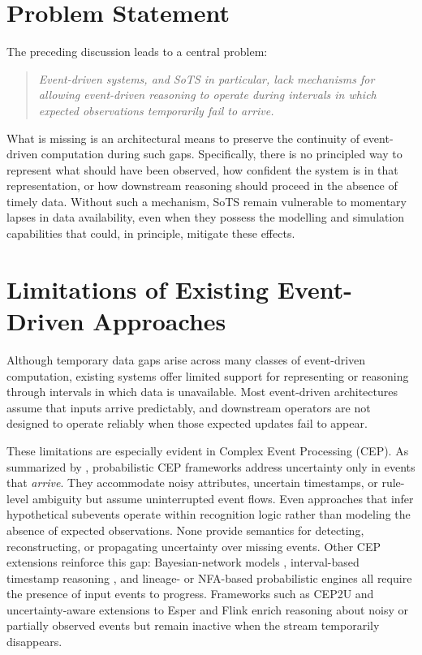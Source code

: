 \section{Problem Statement}

The preceding discussion leads to a central problem:

\begin{quote}
\emph{Event-driven systems, and SoTS in particular, lack mechanisms for allowing event-driven reasoning to operate during intervals in which expected observations temporarily fail to arrive.}
\end{quote}

What is missing is an architectural means to preserve the continuity of event-driven computation during such gaps. Specifically, there is no principled way to represent what should have been observed, how confident the system is in that representation, or how downstream reasoning should proceed in the absence of timely data. Without such a mechanism, SoTS remain vulnerable to momentary lapses in data availability, even when they possess the modelling and simulation capabilities that could, in principle, mitigate these effects.

\section{Limitations of Existing Event-Driven Approaches}

Although temporary data gaps arise across many classes of event-driven computation, existing systems offer limited support for representing or reasoning through intervals in which data is unavailable. Most event-driven architectures assume that inputs arrive predictably, and downstream operators are not designed to operate reliably when those expected updates fail to appear.

These limitations are especially evident in Complex Event Processing (CEP). As summarized by \citet{alevizos2017probabilistic}, probabilistic CEP frameworks address uncertainty only in events that \emph{arrive}. They accommodate noisy attributes, uncertain timestamps, or rule-level ambiguity but assume uninterrupted event flows. Even approaches that infer hypothetical subevents operate within recognition logic rather than modeling the absence of expected observations. None provide semantics for detecting, reconstructing, or propagating uncertainty over missing events. Other CEP extensions reinforce this gap: Bayesian-network models \cite{wasserkrug2010efficient, wasserkrug2012model}, interval-based timestamp reasoning \cite{zhang2013recognizing}, and lineage- or NFA-based probabilistic engines \cite{shen2008probabilistic, kawashima2010complex, chuanfei2010complex, wang2013complex} all require the presence of input events to progress. Frameworks such as CEP2U \cite{cugola2015introducing} and uncertainty-aware extensions to Esper and Flink \cite{moreno2019managing} enrich reasoning about noisy or partially observed events but remain inactive when the stream temporarily disappears.

